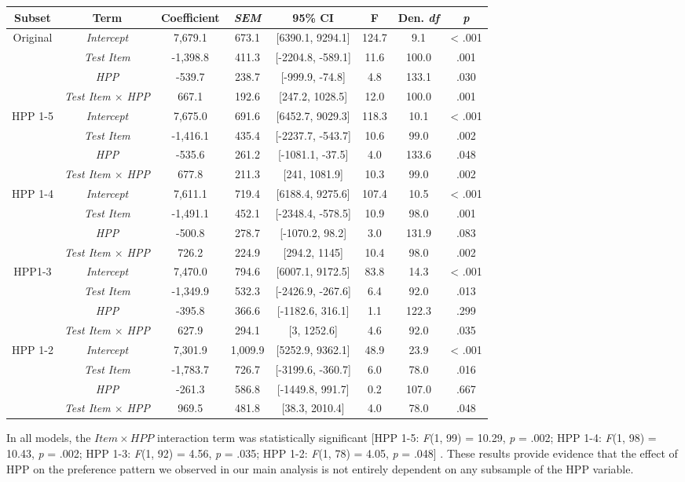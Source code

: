 \documentclass[english,man,man,floatsintext]{apa6}
\begin{document}
\begin{appendix}
\begin{longtable}[]{@{}cccccccc@{}}
\toprule
\textbf{Subset} & \textbf{Term} & \textbf{Coefficient} &
\textbf{\emph{SEM}} & \textbf{95\% CI} & \textbf{F} & \textbf{Den.
\emph{df}} & \textbf{\emph{p}}\tabularnewline
\midrule
\endhead
Original & \emph{Intercept} & 7,679.1 & 673.1 & {[}6390.1, 9294.1{]} &
124.7 & 9.1 & \textless{} .001\tabularnewline
& \emph{Test Item} & -1,398.8 & 411.3 & {[}-2204.8, -589.1{]} & 11.6 &
100.0 & .001\tabularnewline
& \emph{HPP} & -539.7 & 238.7 & {[}-999.9, -74.8{]} & 4.8 & 133.1 &
.030\tabularnewline
& \emph{Test Item \(\times\) HPP} & 667.1 & 192.6 & {[}247.2, 1028.5{]}
& 12.0 & 100.0 & .001\tabularnewline
HPP 1-5 & \emph{Intercept} & 7,675.0 & 691.6 & {[}6452.7, 9029.3{]} &
118.3 & 10.1 & \textless{} .001\tabularnewline
& \emph{Test Item} & -1,416.1 & 435.4 & {[}-2237.7, -543.7{]} & 10.6 &
99.0 & .002\tabularnewline
& \emph{HPP} & -535.6 & 261.2 & {[}-1081.1, -37.5{]} & 4.0 & 133.6 &
.048\tabularnewline
& \emph{Test Item \(\times\) HPP} & 677.8 & 211.3 & {[}241, 1081.9{]} &
10.3 & 99.0 & .002\tabularnewline
HPP 1-4 & \emph{Intercept} & 7,611.1 & 719.4 & {[}6188.4, 9275.6{]} &
107.4 & 10.5 & \textless{} .001\tabularnewline
& \emph{Test Item} & -1,491.1 & 452.1 & {[}-2348.4, -578.5{]} & 10.9 &
98.0 & .001\tabularnewline
& \emph{HPP} & -500.8 & 278.7 & {[}-1070.2, 98.2{]} & 3.0 & 131.9 &
.083\tabularnewline
& \emph{Test Item \(\times\) HPP} & 726.2 & 224.9 & {[}294.2, 1145{]} &
10.4 & 98.0 & .002\tabularnewline
HPP1-3 & \emph{Intercept} & 7,470.0 & 794.6 & {[}6007.1, 9172.5{]} &
83.8 & 14.3 & \textless{} .001\tabularnewline
& \emph{Test Item} & -1,349.9 & 532.3 & {[}-2426.9, -267.6{]} & 6.4 &
92.0 & .013\tabularnewline
& \emph{HPP} & -395.8 & 366.6 & {[}-1182.6, 316.1{]} & 1.1 & 122.3 &
.299\tabularnewline
& \emph{Test Item \(\times\) HPP} & 627.9 & 294.1 & {[}3, 1252.6{]} &
4.6 & 92.0 & .035\tabularnewline
HPP 1-2 & \emph{Intercept} & 7,301.9 & 1,009.9 & {[}5252.9, 9362.1{]} &
48.9 & 23.9 & \textless{} .001\tabularnewline
& \emph{Test Item} & -1,783.7 & 726.7 & {[}-3199.6, -360.7{]} & 6.0 &
78.0 & .016\tabularnewline
& \emph{HPP} & -261.3 & 586.8 & {[}-1449.8, 991.7{]} & 0.2 & 107.0 &
.667\tabularnewline
& \emph{Test Item \(\times\) HPP} & 969.5 & 481.8 & {[}38.3, 2010.4{]} &
4.0 & 78.0 & .048\tabularnewline
\bottomrule
\end{longtable}

In all models, the \(Item \times HPP\) interaction term was
statistically significant {[}HPP 1-5: \emph{F}(1, 99) = 10.29, \emph{p}
= .002; HPP 1-4: \emph{F}(1, 98) = 10.43, \emph{p} = .002; HPP 1-3:
\emph{F}(1, 92) = 4.56, \emph{p} = .035; HPP 1-2: \emph{F}(1, 78) =
4.05, \emph{p} = .048{]} . These results provide evidence that the
effect of HPP on the preference pattern we observed in our main analysis
is not entirely dependent on any subsample of the HPP variable.


\end{appendix}
\end{document}
